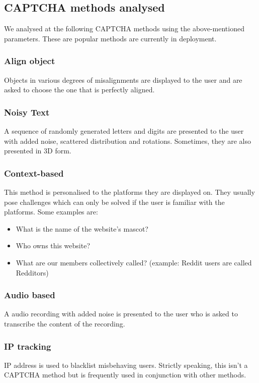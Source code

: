 \subsection{CAPTCHA methods analysed}
We analysed at the following CAPTCHA methods using the above-mentioned
parameters. These are popular methods are currently in deployment.

\subsubsection{Align object}
Objects in various degrees of misalignments are displayed to the user and are
asked to choose the one that is perfectly aligned.

\subsubsection{Noisy Text}
A sequence of randomly generated letters and digits are presented to the user
with added noise, scattered distribution and rotations. Sometimes, they are also
presented in 3D form.

\subsubsection{Context-based}
This method is personalised to the platforms they are displayed on. They usually
pose challenges which can only be solved if the user is familiar with the
platforms. Some examples are:
	\begin{itemize}
		\item What is the name of the website's mascot?  
		\item Who owns this website?
		\item What are our members collectively called? (example: Reddit users are
			called Redditors)
	\end{itemize}

\subsubsection{Audio based}
A audio recording with added noise is presented to the user who is asked to
transcribe the content of the recording.

\subsubsection{IP tracking}
IP address is used to blacklist misbehaving users. Strictly speaking, this isn't
a CAPTCHA method but is frequently used in conjunction with other methods.

